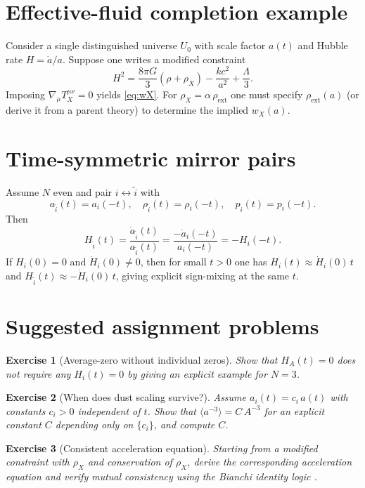 \documentclass[11pt]{article}
\newtheorem{exercise}{Exercise}
\begin{document}
\appendix

\section{Effective-fluid completion example}
Consider a single distinguished universe $U_0$ with scale factor $a(t)$ and Hubble rate $H=\dot a/a$. Suppose one writes a modified constraint
\[
H^2=\frac{8\pi G}{3}\left(\rho+\rho_X\right)-\frac{k c^2}{a^2}+\frac{\Lambda}{3}.
\]
Imposing $\nabla_\mu T_X^{\mu\nu}=0$ yields \eqref{eq:wX}. For $\rho_X=\alpha\,\rho_{\mathrm{ext}}$ one must specify $\rho_{\mathrm{ext}}(a)$ (or derive it from a parent theory) to determine the implied $w_X(a)$.

\section{Time-symmetric mirror pairs}
Assume $N$ even and pair $i\leftrightarrow\tilde i$ with
\[
a_{\tilde i}(t)=a_i(-t),\quad \rho_{\tilde i}(t)=\rho_i(-t),\quad p_{\tilde i}(t)=p_i(-t).
\]
Then
\[
H_{\tilde i}(t)=\frac{\dot a_{\tilde i}(t)}{a_{\tilde i}(t)}=\frac{-\dot a_i(-t)}{a_i(-t)}=-H_i(-t).
\]
If $H_i(0)=0$ and $\dot H_i(0)\neq0$, then for small $t>0$ one has $H_i(t)\approx \dot H_i(0)\,t$ and $H_{\tilde i}(t)\approx -\dot H_i(0)\,t$, giving explicit sign-mixing at the same $t$.

\section{Suggested assignment problems}

\begin{exercise}[Average-zero without individual zeros]
Show that $H_A(t)=0$ does not require any $H_i(t)=0$ by giving an explicit example for $N=3$.
\end{exercise}

\begin{exercise}[When does dust scaling survive?]
Assume $a_i(t)=c_i\,a(t)$ with constants $c_i>0$ independent of $t$. Show that
$\langle a^{-3}\rangle = C\,A^{-3}$ for an explicit constant $C$ depending only on $\{c_i\}$, and compute $C$.
\end{exercise}

\begin{exercise}[Consistent acceleration equation]
Starting from a modified constraint with $\rho_X$ and conservation of $\rho_X$, derive the corresponding acceleration equation and verify mutual consistency using the Bianchi identity logic \citep{Wald1984}.
\end{exercise}
\end{document}
